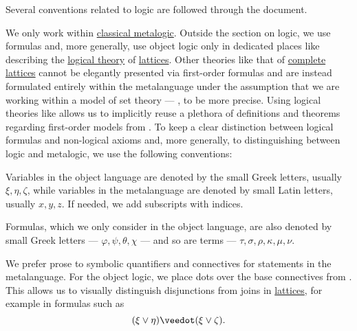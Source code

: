 \begin{remark}\label{rem:mathematical_logic_conventions}
  Several conventions related to logic are followed through the document.

  We only work within \hyperref[def:classical_propositional_deductive_systems]{classical metalogic}. Outside the section on logic, we use formulas and, more generally, use object logic only in dedicated places like  describing the \hyperref[def:first_order_theory]{logical theory} of \hyperref[def:lattice]{lattices}. Other theories like that of \hyperref[def:complete_lattice]{complete lattices} cannot be elegantly presented via first-order formulas and are instead formulated entirely within the metalanguage under the assumption that we are working within a model of set theory --- \hyperref[def:axiom_of_universes]{}, to be more precise. Using logical theories like  allows us to implicitly reuse a plethora of definitions and theorems regarding first-order models from . To keep a clear distinction between logical formulas and non-logical axioms and, more generally, to distinguishing between logic and metalogic, we use the following conventions:

  \begin{thmenum}
     Variables in the object language are denoted by the small Greek letters, usually \( \xi, \eta, \zeta \), while variables in the metalanguage are denoted by small Latin letters, usually \( x, y, z \). If needed, we add subscripts with indices.

     Formulas, which we only consider in the object language, are also denoted by small Greek letters --- \( \varphi, \psi, \theta, \chi \) --- and so are terms --- \( \tau, \sigma, \rho, \kappa, \mu, \nu \).

     We prefer prose to symbolic quantifiers and connectives for statements in the metalanguage. For the object logic, we place dots over the base connectives from . This allows us to visually distinguish disjunctions from joins in \hyperref[def:lattice]{lattices}, for example in formulas such as
    \begin{equation*}
      (\xi \vee \eta) \synvee (\xi \vee \zeta).
    \end{equation*}


\end{thmenum}
\end{remark}
